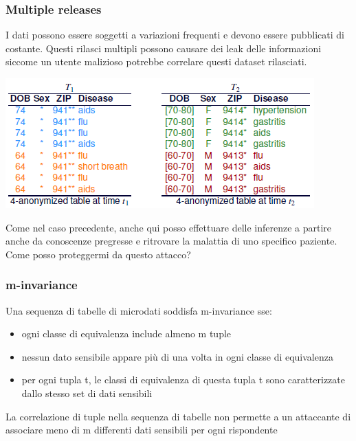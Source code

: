 \subsubsection{Multiple releases}
I dati possono essere soggetti a variazioni frequenti e devono essere pubblicati di costante. Questi rilasci multipli possono causare dei leak delle informazioni siccome un utente malizioso potrebbe correlare questi dataset rilasciati. 
\begin{center}
    \includegraphics[scale=0.6]{img/multrel.png}
\end{center}
Come nel caso precedente, anche qui posso effettuare delle inferenze a partire anche da conoscenze pregresse e ritrovare la malattia di uno specifico paziente.\\
Come posso proteggermi da questo attacco?

\subsubsection{m-invariance}
Una sequenza di tabelle di microdati soddisfa m-invariance sse:
\begin{itemize}
    \item ogni classe di equivalenza include almeno m tuple
    \item nessun dato sensibile appare più di una volta in ogni classe di equivalenza
    \item per ogni tupla t, le classi di equivalenza di questa tupla t sono caratterizzate dallo stesso set di dati sensibili
\end{itemize}
La correlazione di tuple nella sequenza di tabelle non permette a un attaccante di associare meno di m differenti dati sensibili per ogni rispondente

